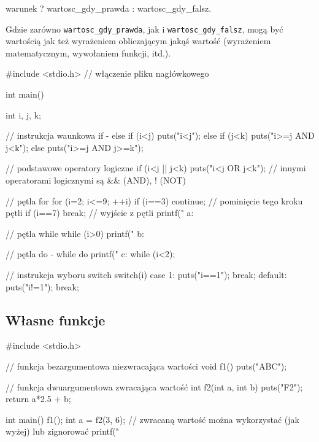 \begin{CodeFrame*}[c]{}
warunek ? wartosc_gdy_prawda : wartosc_gdy_falsz.
\end{CodeFrame*}
Gdzie zarówno \Verb#wartosc_gdy_prawda#, jak i  \Verb#wartosc_gdy_falsz#, mogą być wartością jak też wyrażeniem obliczającym jakąś wartość (wyrażeniem matematycznym, wywołaniem funkcji, itd.).

\begin{CodeFrame*}[c]{}
#include <stdio.h> // włączenie pliku nagłówkowego

int main() {
    int i, j, k;
    
    // instrukcja waunkowa if - else
    if (i<j) {
        puts("i<j");
    } else if (j<k) {
        puts("i>=j AND j<k");
    } else {
        puts("i>=j AND j>=k");
    }
    
    // podstawowe operatory logiczne
    if (i<j || j<k)
        puts("i<j OR j<k");
    // innymi operatorami logicznymi są && (AND), ! (NOT)
    
    // pętla for
    for (i=2; i<=9; ++i) {
        if (i==3)
            continue; // pominięcie tego kroku pętli
        if (i==7)
            break; // wyjście z pętli
        printf(" a: %
    }
    
    // pętla while
    while (i>0) {
        printf(" b: %
    }
    
    // pętla do - while
    do {
        printf(" c: %
    } while (i<2);
    
    // instrukcja wyboru switch
    switch(i) {
        case 1:
            puts("i==1");
            break;
        default:
            puts("i!=1");
            break;
    }
}
\end{CodeFrame*}


\subsection{Własne funkcje}

\begin{CodeFrame*}[c]{}
#include <stdio.h>

// funkcja bezargumentowa niezwracająca wartości
void f1() {
    puts("ABC");
}

// funkcja dwuargumentowa zwracająca wartość
int f2(int a, int b) {
    puts("F2");
    return a*2.5 + b;
}

int main() {
    f1();
    int a = f2(3, 6);
    // zwracaną wartość można wykorzystać (jak wyżej) lub zignorować
    printf("%
}
\end{CodeFrame*}

